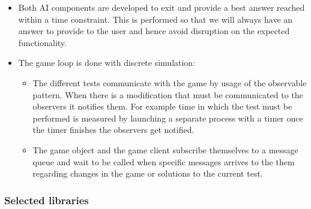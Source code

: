\documentclass[a4paper,10pt,titlepage]{article}
\begin{document}
\begin{itemize}
	\item Both AI components are developed to exit and provide a best answer reached within a time constraint. This is performed so that we will always have an answer to provide to the user and hence avoid disruption on the expected functionality.
	\item The game loop is done with discrete simulation:
	\begin{itemize}
		\item The different tests communicate with the game by usage of the observable pattern. When there is a modification that must be communicated to the observers it notifies them. For example time in which the test must be performed is measured by launching a separate process with a timer once the timer finishes the observers get notified.
		\item The game object and the game client subscribe themselves to a message queue and wait to be called when specific messages arrives to the them regarding changes in the game or solutions to the current test. 
	\end{itemize}
	
\end{itemize}

\subsubsection{Selected libraries}
\end{document}
